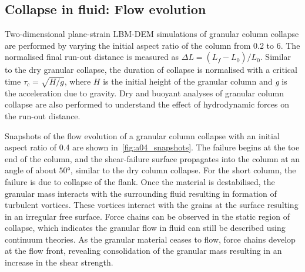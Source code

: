 \subsection{Collapse in fluid: Flow evolution}
\label{sec:collapse_fluid_evolution}
Two-dimensional plane-strain LBM-DEM simulations of granular column 
collapse are performed by varying the initial aspect ratio of the column from 
0.2 to 6. The normalised final run-out distance is measured as $\Delta L = 
(L_{\textit{f}}-L_{\textit{0}})/L_{\textit{0}}$. Similar to the dry granular 
collapse, the duration of collapse is normalised with a critical time $\tau_c 
= \sqrt{H/g}$, where $H$ is the initial height of the granular column and 
\textit{g} is the acceleration due to gravity. Dry and buoyant analyses of 
granular column collapse are also performed to understand the effect of 
hydrodynamic forces on the run-out distance.

Snapshots of the flow evolution of a granular column collapse with an initial 
aspect ratio of 0.4 are shown in~\cref{fig:a04_snapshots}. The failure begins 
at the toe end of the column, and the shear-failure surface propagates into the 
column at an angle of about $50\si{\degree}$, similar to the dry column 
collapse. For the short column, the failure is due to collapse of the flank. 
Once the material is destabilised, the granular mass interacts with the 
surrounding fluid resulting in formation of turbulent vortices. These vortices 
interact with the grains at the surface resulting in an irregular free surface. 
Force chains can be observed in the static region of collapse, which indicates 
the granular flow in fluid can still be described using continuum theories. As 
the granular material ceases to flow, force chains develop at the flow front, 
revealing consolidation of the granular mass resulting in an increase in the 
shear strength. 

